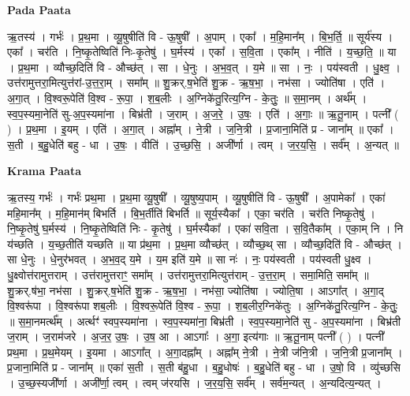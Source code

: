 \documentclass[17pt]{extarticle}
\begin{document}
\textbf{Pada Paata} \newline

ऋ॒तस्य॑ । गर्भः॑ । प्र॒थ॒मा । व्यू॒षुषीति॑ वि - ऊ॒षुषी᳚ । अ॒पाम् । एका᳚ । म॒हि॒मान᳚म् । बि॒भ॒र्ति॒ ॥ सूर्य॑स्य । एका᳚ । चर॑ति । नि॒ष्कृ॒तेष्विति॑ निः-कृ॒तेषु॑ । घ॒र्मस्य॑ । एका᳚ । स॒वि॒ता । एका᳚म् । नीति॑ । य॒च्छ॒ति॒ ॥ या । प्र॒थ॒मा । व्यौच्छ॒दिति॑ वि - औच्छ॑त् । सा । धे॒नुः । अ॒भ॒व॒त् । य॒मे ॥ सा । नः॒ । पय॑स्वती । धु॒क्ष्व॒ । उत्त॑रामुत्तरा॒मित्युत्त॑रां-उ॒त्त॒रा॒म् । समा᳚म् ॥ शु॒क्रर्.ष॒भेति॑ शु॒क्र - ऋ॒ष॒भा॒ । नभ॑सा । ज्योति॑षा । एति॑ । अ॒गा॒त् । वि॒श्वरू॒पेति॑ वि॒श्व - रू॒पा॒ । श॒ब॒लीः । अ॒ग्निके॑तु॒रित्य॒ग्नि - के॒तुः॒ ॥ स॒मा॒नम् । अर्थ᳚म् । स्व॒प॒स्यमा॒नेति॑ सु-अ॒प॒स्यमा॑ना । बिभ्र॑ती । ज॒राम् । अ॒ज॒रे॒ । उ॒षः॒ । एति॑ । अ॒गाः॒ ॥ ऋ॒तू॒नाम् । पत्नी᳚ ( ) । प्र॒थ॒मा । इ॒यम् । एति॑ । अ॒गा॒त् । अह्ना᳚म् । ने॒त्री । ज॒नि॒त्री । प्र॒जाना॒मिति॑ प्र - जाना᳚म् ॥ एका᳚ । स॒ती । ब॒हु॒धेति॑ बहु - धा । उ॒षः॒ । वीति॑ । उ॒च्छ॒सि॒ । अजी᳚र्णा । त्वम् । ज॒र॒य॒सि॒ । सर्व᳚म् । अ॒न्यत् ॥  \newline


\textbf{Krama Paata} \newline

ऋ॒तस्य॒ गर्भः॑ । गर्भः॑ प्रथ॒मा । प्र॒थ॒मा व्यू॒षुषी᳚ । व्यू॒षुष्य॒पाम् । व्यू॒षुषीति॑ वि - ऊ॒षुषी᳚ । अ॒पामेका᳚ । एका॑ महि॒मान᳚म् । म॒हि॒मान॑म् बिभर्ति । बि॒भ॒र्तीति॑ बिभर्ति ॥ सूर्य॒स्यैका᳚ । एका॒ चर॑ति । चर॑ति निष्कृ॒तेषु॑ । नि॒ष्कृ॒तेषु॑ घ॒र्मस्य॑ । नि॒ष्कृ॒तेष्विति॑ निः - कृ॒तेषु॑ । घ॒र्मस्यैका᳚ । एका॑ सवि॒ता । स॒वि॒तैका᳚म् । एका॒म् नि । नि य॑च्छति । य॒च्छ॒तीति॑ यच्छति ॥ या प्र॑थ॒मा । प्र॒थ॒मा व्यौच्छ॑त् । व्यौच्छ॒थ् सा । व्यौच्छ॒दिति॑ वि - औच्छ॑त् । सा धे॒नुः । धे॒नुर॑भवत् । अ॒भ॒व॒द् य॒मे । य॒म इति॑ य॒मे ॥ सा नः॑ । नः॒ पय॑स्वती । पय॑स्वती धु॒क्ष्व । धु॒क्ष्वोत्त॑रामुत्तराम् । उत्त॑रामुत्तराꣳ॒॒ समा᳚म् । उत्त॑रामुत्तरा॒मित्युत्त॑राम् - उ॒त्त॒रा॒म् । समा॒मिति॒ समा᳚म् ॥ शु॒क्रर्.ष॑भा॒ नभ॑सा । शु॒क्रर्.ष॒भेति॑ शु॒क्र - ऋ॒ष॒भा॒ । नभ॑सा॒ ज्योति॑षा । ज्योति॒षा । आऽगा᳚त् । अ॒गा॒द् वि॒श्वरू॑पा । वि॒श्वरू॑पा शब॒लीः । वि॒श्वरू॒पेति॑ वि॒श्व - रू॒पा॒ । श॒ब॒लीर॒ग्निके॑तुः । अ॒ग्निके॑तु॒रित्य॒ग्नि - के॒तुः॒ ॥ स॒मा॒नमर्त्थ᳚म् । अर्त्थꣳ॑ स्वप॒स्यमा॑ना । स्व॒प॒स्यमा॑ना॒ बिभ्र॑ती । स्व॒प॒स्यमा॒नेति॑ सु - अ॒प॒स्यमा॑ना । बिभ्र॑ती ज॒राम् । ज॒राम॑जरे । अ॒ज॒र॒ उ॒षः॒ । उ॒ष॒ आ । आऽगाः᳚ । अ॒गा॒ इत्य॑गाः ॥ ऋ॒तू॒नाम् पत्नी᳚ ( ) । पत्नी᳚ प्रथ॒मा । प्र॒थ॒मेयम् । इ॒यमा । आऽगा᳚त् । अ॒गा॒दह्ना᳚म् । अह्ना᳚म् ने॒त्री । ने॒त्री ज॑नि॒त्री । ज॒नि॒त्री प्र॒जाना᳚म् । प्र॒जाना॒मिति॑ प्र - जाना᳚म् ॥ एका॑ स॒ती । स॒ती ब॑हु॒धा । ब॒हु॒धोषः॑ । ब॒हु॒धेति॑ बहु - धा । उ॒षो॒ वि । व्यु॑च्छसि । उ॒च्छ॒स्यजी᳚र्णा । अजी᳚र्णा॒ त्वम् । त्वम् ज॑रयसि । ज॒र॒य॒सि॒ सर्व᳚म् । सर्व॑म॒न्यत् । अ॒न्यदित्य॒न्यत् । \newline
\end{document}
